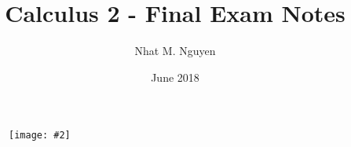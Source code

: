\documentclass[9pt, landscape, a4paper]{scrartcl}
\title{\vspace{-4ex}\Large{Calculus 2 - Final Exam Notes}}
\author{Nhat M. Nguyen}
\date{June 2018}
\newcommand{\img}[2][]
  {
    \begin{figure}[H]
      \centering
      \texttt{[image: \#2]}
    \end{figure}
  }
\begin{document}
    \maketitle
    \img[width=3cm]{logo.jpeg}
      \setcounter{tocdepth}{2}
      \tableofcontents
      
      
      
      
\end{document}

